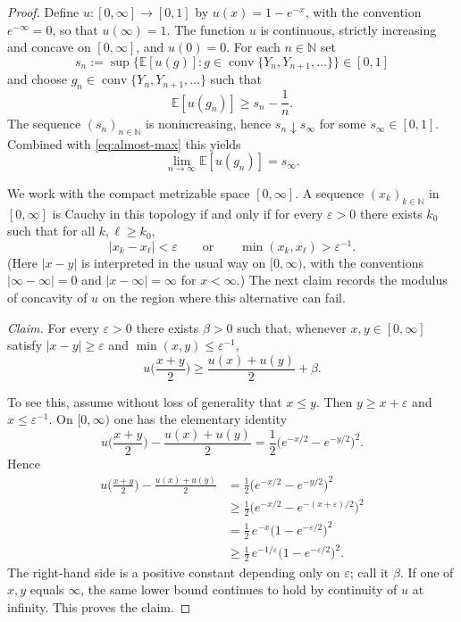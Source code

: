 \documentclass[11pt,a4paper]{report}
\numberwithin{equation}{chapter}
\theoremstyle{plain}
\theoremstyle{definition}
\newcommand{\E}{\mathbb{E}}
\newcommand{\N}{\mathbb{N}}
\begin{document}
\begin{proof}
    Define $u\colon[0,\infty]\to[0,1]$ by $u(x)=1-e^{-x}$, with the convention $e^{-\infty}=0$, so that $u(\infty)=1$. The function $u$ is continuous, strictly increasing and concave on $[0,\infty]$, and $u(0)=0$. For each $n\in\N$ set
    \[
        s_n:=\sup\big\{\E[u(g)]:g\in\operatorname{conv}\{Y_n,Y_{n+1},\dots\}\big\}\in[0,1]
    \]
    and choose $g_n\in\operatorname{conv}\{Y_n,Y_{n+1},\dots\}$ such that
    \begin{equation}\label{eq:almost-max}
        \E[u(g_n)]\ge s_n-\frac1n.
    \end{equation}
    The sequence $(s_n)_{n\in\N}$ is nonincreasing, hence $s_n\downarrow s_\infty$ for some $s_\infty\in[0,1]$. Combined with \eqref{eq:almost-max} this yields
    \[
        \lim_{n\to\infty}\E[u(g_n)]=s_\infty.
    \]

    We work with the compact metrizable space $[0,\infty]$. A sequence $(x_k)_{k\in\N}$ in $[0,\infty]$ is Cauchy in this topology if and only if for every $\varepsilon>0$ there exists $k_0$ such that for all $k,\ell\ge k_0$,
    \[
        |x_k-x_\ell|<\varepsilon\qquad\text{or}\qquad\min(x_k,x_\ell)>\varepsilon^{-1}.
    \]
    (Here $|x-y|$ is interpreted in the usual way on $[0,\infty)$, with the conventions $|\infty-\infty|=0$ and $|x-\infty|=\infty$ for $x<\infty$.) The next claim records the modulus of concavity of $u$ on the region where this alternative can fail.

    \emph{Claim.} For every $\varepsilon>0$ there exists $\beta>0$ such that, whenever $x,y\in[0,\infty]$ satisfy $|x-y|\ge\varepsilon$ and $\min(x,y)\le\varepsilon^{-1}$,
    \[
        u\Big(\frac{x+y}2\Big)\ge\frac{u(x)+u(y)}2+\beta.
    \]

    To see this, assume without loss of generality that $x\le y$. Then $y\ge x+\varepsilon$ and $x\le\varepsilon^{-1}$. On $[0,\infty)$ one has the elementary identity
    \[
        u\Big(\frac{x+y}2\Big)-\frac{u(x)+u(y)}2=\frac12\big(e^{-x/2}-e^{-y/2}\big)^2.
    \]
    Hence
    \begin{align*}
        u\Big(\frac{x+y}2\Big)-\frac{u(x)+u(y)}2
         & =\frac12\big(e^{-x/2}-e^{-y/2}\big)^2                                                      \\
         & \ge\frac12\big(e^{-x/2}-e^{-(x+\varepsilon)/2}\big)^2                                        \\
         & =\frac12\,e^{-x}\big(1-e^{-\varepsilon/2}\big)^2                                              \\
         & \ge\frac12\,e^{-1/\varepsilon}\big(1-e^{-\varepsilon/2}\big)^2.
    \end{align*}
    The right-hand side is a positive constant depending only on $\varepsilon$; call it $\beta$. If one of $x,y$ equals $\infty$, the same lower bound continues to hold by continuity of $u$ at infinity. This proves the claim.


\end{proof}
\end{document}
